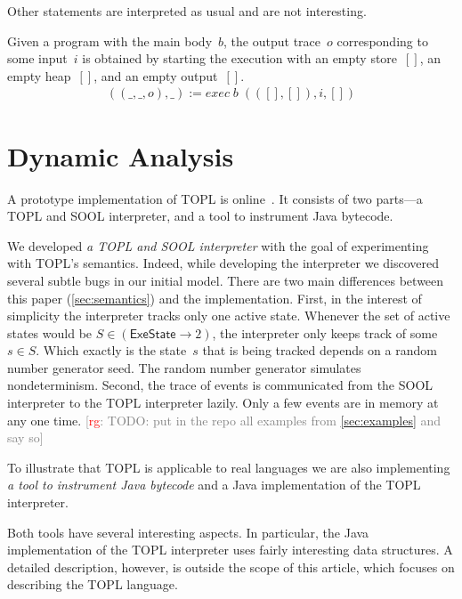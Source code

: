 \documentclass[preprint]{sigplanconf} %
\newcommand{\note}[2]{\textcolor{gray}{[\textcolor{red}{#1}: #2]}}
\newcommand{\rg}[1]{\note{rg}{#1}}
\newcommand{\set}[1]{\ensuremath{\mathsf{#1}}}
\theoremstyle{definition}
\theoremstyle{remark}
\begin{document}
Other statements are interpreted as usual and are not interesting.

Given a program with the main body~$b$, the output trace~$o$ corresponding to some input~$i$ is obtained by starting the execution with an empty store~$[]$, an empty heap~$[]$, and an empty output~$[]$.
\begin{align}
((\_,\_,o),\_):=\mathit{exec}\;b\;(([],[]),i,[])
\end{align}

\section{Dynamic Analysis}\label{sec:dynamic} %

A prototype implementation of TOPL is online~\cite{web:topl.prototype}.
It consists of two parts---a TOPL and SOOL interpreter, and a tool to instrument Java bytecode.

We developed \emph{a TOPL and SOOL interpreter} with the goal of experimenting with TOPL's semantics.
Indeed, while developing the interpreter we discovered several subtle bugs in our initial model.
There are two main differences between this paper (\autoref{sec:semantics}) and the implementation.
First, in the interest of simplicity the interpreter tracks only one active state.
Whenever the set of active states would be $S\in(\set{ExeState}\to2)$, the interpreter only keeps track of some $s\in S$.
Which exactly is the state~$s$ that is being tracked depends on a random number generator seed.
The random number generator simulates nondeterminism.
Second, the trace of events is communicated from the SOOL interpreter to the TOPL interpreter lazily.
Only a few events are in memory at any one time.
\rg{TODO: put in the repo all examples from \autoref{sec:examples} and say so}

To illustrate that TOPL is applicable to real languages we are also implementing \emph{a tool to instrument Java bytecode} and a Java implementation of the TOPL interpreter.

Both tools have several interesting aspects.
In particular, the Java implementation of the TOPL interpreter uses fairly interesting data structures.
A detailed description, however, is outside the scope of this article, which focuses on describing the TOPL language.

\end{document}

